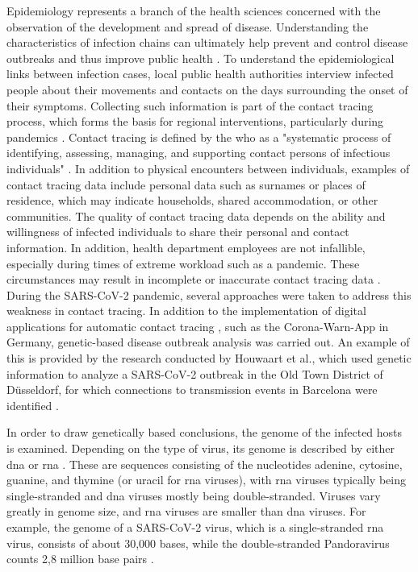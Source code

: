 Epidemiology represents a branch of the health sciences concerned with the observation of the development and spread of disease. Understanding the characteristics of infection chains can ultimately help prevent and control disease outbreaks and thus improve public health \cite{Bon1}.
To understand the epidemiological links between infection cases, local public health authorities interview infected people about their movements and contacts on the days surrounding the onset of their symptoms. Collecting such information is part of the contact tracing process, which forms the basis for regional interventions, particularly during pandemics \cite{Fet1}. Contact tracing is defined by the \acrshort{who} as a "systematic process of identifying, assessing, managing, and supporting contact persons of infectious individuals" \cite{Who2}. In addition to physical encounters between individuals, examples of contact tracing data include personal data such as surnames or places of residence, which may indicate households, shared accommodation, or other communities. The quality of contact tracing data depends on the ability and willingness of infected individuals to share their personal and contact information. In addition, health department employees are not infallible, especially during times of extreme workload such as a pandemic. These circumstances may result in incomplete or inaccurate contact tracing data \cite{Rub1}. During the SARS-CoV-2 pandemic, several approaches were taken to address this weakness in contact tracing. In addition to the implementation of digital applications for automatic contact tracing \cite{Cho1}, such as the Corona-Warn-App in Germany, genetic-based disease outbreak analysis was carried out. An example of this is provided by the research conducted by Houwaart et al., which used genetic information to analyze a SARS-CoV-2 outbreak in the Old Town District of Düsseldorf, for which connections to transmission events in Barcelona were identified \cite{Wal3}.

In order to draw genetically based conclusions, the genome of the infected hosts is examined. Depending on the type of virus, its genome is described by either \acrfull{dna} or \acrfull{rna} \cite{Can1}. These are sequences consisting of the nucleotides adenine, cytosine, guanine, and thymine (or uracil for \acrshort{rna} viruses), with \acrshort{rna} viruses typically being single-stranded and \acrshort{dna} viruses mostly being double-stranded. Viruses vary greatly in genome size, and \acrshort{rna} viruses are smaller than \acrshort{dna} viruses. For example, the genome of a SARS-CoV-2 virus, which is a single-stranded \acrshort{rna} virus, consists of about 30,000 bases, while the double-stranded Pandoravirus counts 2,8 million base pairs \cite{Dur1}.

